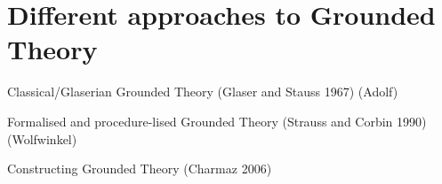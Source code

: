 \section{Different approaches to Grounded Theory}
Classical/Glaserian Grounded Theory (Glaser and Stauss 1967) (Adolf)

Formalised and procedure-lised Grounded Theory (Strauss and Corbin 1990) (Wolfwinkel)

Constructing Grounded Theory (Charmaz 2006)